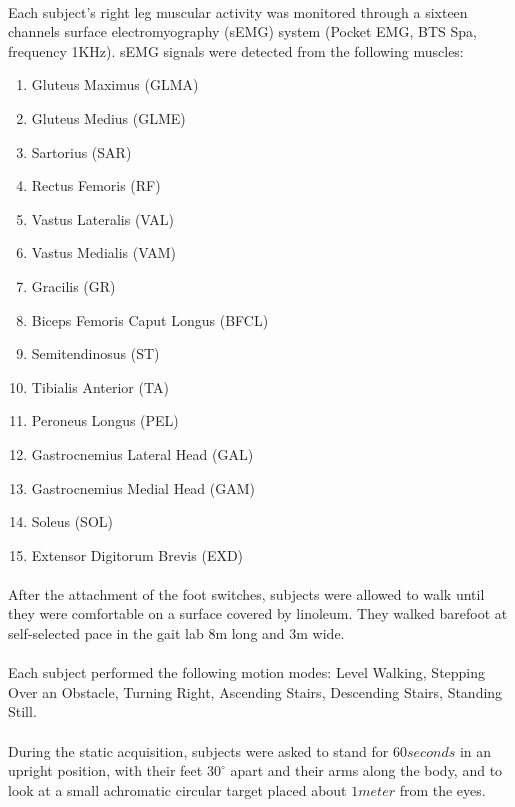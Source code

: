 \documentclass[12pt]{article}
\begin{document}
\paragraph{}
Each subject’s right leg muscular activity was monitored through a sixteen channels surface electromyography (sEMG) system (Pocket EMG, BTS Spa, frequency 1KHz). sEMG signals were detected from the following muscles:
\begin{enumerate}
	\item Gluteus Maximus (GLMA)
	\item Gluteus Medius (GLME)
	\item Sartorius (SAR)
	\item Rectus Femoris (RF) 
	\item Vastus Lateralis (VAL)
	\item Vastus Medialis (VAM)
	\item Gracilis (GR)
	\item Biceps Femoris Caput Longus (BFCL)
	\item Semitendinosus (ST)
	\item Tibialis Anterior (TA)
	\item Peroneus Longus (PEL)
	\item Gastrocnemius Lateral Head (GAL)
	\item Gastrocnemius Medial Head (GAM)
	\item Soleus (SOL) 
	\item Extensor Digitorum Brevis (EXD)
\end{enumerate}

\paragraph{}
After the attachment of the foot switches, subjects were allowed to walk until they were comfortable on a surface covered by linoleum. They walked barefoot at self-selected pace in the gait lab 8m long and 3m wide. 

\paragraph{}
Each subject performed the following motion modes: Level Walking, Stepping Over an Obstacle, Turning Right, Ascending Stairs, Descending Stairs, Standing Still. 

\paragraph{}
During the static acquisition, subjects were asked to stand for $60 seconds$ in an upright position, with their feet $30^{\circ}$ apart and their arms along the body, and to look at a small achromatic circular target placed about $1 meter$ from the eyes.
\end{document}
